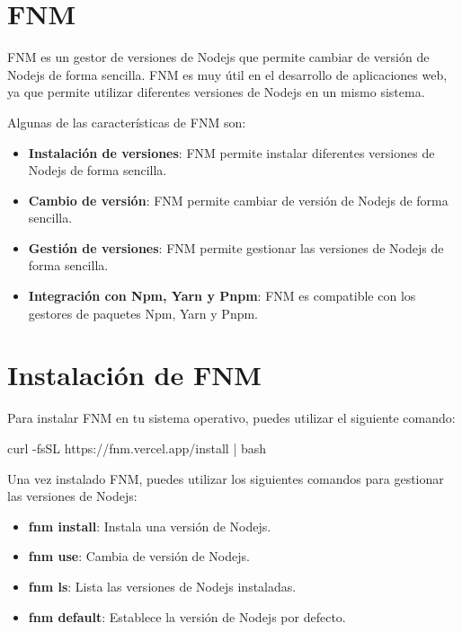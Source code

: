 \documentclass[
  a4paper,
  DIV=11,
  numbers=noendperiod,
  onepage,
  openany]{scrreprt}
\newenvironment{Shaded}{\begin{snugshade}}{\end{snugshade}}
\newcommand{\AttributeTok}[1]{\textcolor[rgb]{0.40,0.45,0.13}{#1}}
\newcommand{\ExtensionTok}[1]{\textcolor[rgb]{0.00,0.23,0.31}{#1}}
\newcommand{\FunctionTok}[1]{\textcolor[rgb]{0.28,0.35,0.67}{#1}}
\newcommand{\KeywordTok}[1]{\textcolor[rgb]{0.00,0.23,0.31}{#1}}
\newcommand{\NormalTok}[1]{\textcolor[rgb]{0.00,0.23,0.31}{#1}}
\begin{document}
\section{FNM}\label{fnm}

FNM es un gestor de versiones de Nodejs que permite cambiar de versión
de Nodejs de forma sencilla. FNM es muy útil en el desarrollo de
aplicaciones web, ya que permite utilizar diferentes versiones de Nodejs
en un mismo sistema.

Algunas de las características de FNM son:

\begin{itemize}
\item
  \textbf{Instalación de versiones}: FNM permite instalar diferentes
  versiones de Nodejs de forma sencilla.
\item
  \textbf{Cambio de versión}: FNM permite cambiar de versión de Nodejs
  de forma sencilla.
\item
  \textbf{Gestión de versiones}: FNM permite gestionar las versiones de
  Nodejs de forma sencilla.
\item
  \textbf{Integración con Npm, Yarn y Pnpm}: FNM es compatible con los
  gestores de paquetes Npm, Yarn y Pnpm.
\end{itemize}

\section{Instalación de FNM}\label{instalaciuxf3n-de-fnm}

Para instalar FNM en tu sistema operativo, puedes utilizar el siguiente
comando:

\begin{Shaded}
\begin{Highlighting}[]
\ExtensionTok{curl} \AttributeTok{{-}fsSL}\NormalTok{ https://fnm.vercel.app/install }\KeywordTok{|} \FunctionTok{bash}
\end{Highlighting}
\end{Shaded}

Una vez instalado FNM, puedes utilizar los siguientes comandos para
gestionar las versiones de Nodejs:

\begin{itemize}
\item
  \textbf{fnm install}: Instala una versión de Nodejs.
\item
  \textbf{fnm use}: Cambia de versión de Nodejs.
\item
  \textbf{fnm ls}: Lista las versiones de Nodejs instaladas.
\item
  \textbf{fnm default}: Establece la versión de Nodejs por defecto.
\end{itemize}
\end{document}
